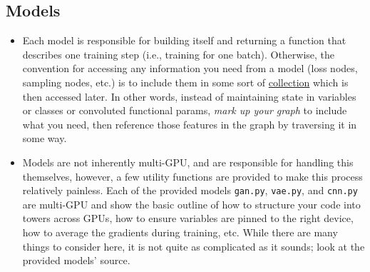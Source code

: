 \documentclass{article}
\begin{document}
\begin{flushleft}
  \section{Models}
  \begin{itemize}
  \item Each model is responsible for building itself and returning a function that describes one training step (i.e., training for one batch). Otherwise, the convention for accessing any information you need from a model (loss nodes, sampling nodes, etc.) is to include them in some sort of \href{https://www.tensorflow.org/versions/r0.12/api_docs/python/framework/graph_collections}{collection} which is then accessed later. In other words, instead of maintaining state in variables or classes or convoluted functional params, \emph{mark up your graph} to include what you need, then reference those features in the graph by traversing it in some way.
  \item Models are not inherently multi-GPU, and are responsible for handling this themselves, however, a few utility functions are provided to make this process relatively painless. Each of the provided models \texttt{gan.py}, \texttt{vae.py}, and \texttt{cnn.py} are multi-GPU and show the basic outline of how to structure your code into towers across GPUs, how to ensure variables are pinned to the right device, how to average the gradients during training, etc. While there are many things to consider here, it is not quite as complicated as it sounds; look at the provided models' source.
  \end{itemize}  



\end{flushleft}
\end{document}
